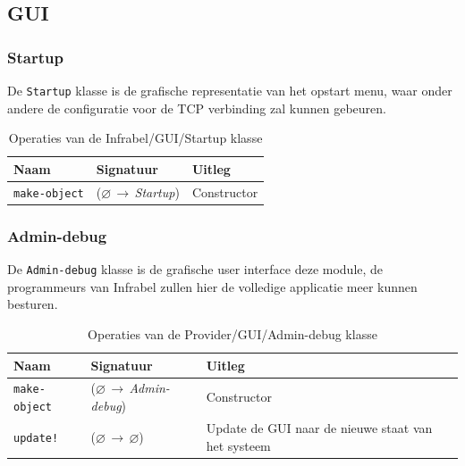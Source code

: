 \documentclass[a4paper, 11pt]{article}
\newcommand{\naar}{\,$\rightarrow$\,}
\renewcommand{\empty}{$\varnothing$}
\newcommand{\<}{\scriptsize\textless\normalsize}
\renewcommand{\>}{\scriptsize\textgreater\normalsize}
\begin{document}
\subsection{GUI} %

\subsubsection{Startup} %
De \texttt{Startup} klasse is de grafische representatie van het opstart menu, waar onder andere de configuratie voor de TCP verbinding zal kunnen gebeuren.
\begin{table}[H]
	\begin{center}
		\begin{tabular}{|l l l|}
			\hline
			\textbf{Naam} & \textbf{Signatuur} & \textbf{Uitleg}\\
			\hline
			\texttt{make-object} & (\empty \naar \textit{Startup}) & Constructor\\
			\hline
		\end{tabular}
		\caption{Operaties van de Infrabel/GUI/Startup klasse}
	\end{center}
\end{table}

\newpage

\subsubsection{Admin-debug} %
De \texttt{Admin-debug} klasse is de grafische user interface deze module, de programmeurs van Infrabel zullen hier de volledige applicatie meer kunnen besturen.
\begin{table}[H]
	\begin{center}
		\begin{tabular}{|l l l|}
			\hline
			\textbf{Naam} & \textbf{Signatuur} & \textbf{Uitleg}\\
			\hline
			\texttt{make-object} & (\empty \naar \textit{Admin-debug}) & Constructor\\
			\hline
			\texttt{update!} & (\empty \naar \empty) & Update de GUI naar de nieuwe staat van het systeem\\
			\hline
		\end{tabular}
		\caption{Operaties van de Provider/GUI/Admin-debug klasse}
	\end{center}
\end{table}
\end{document}
